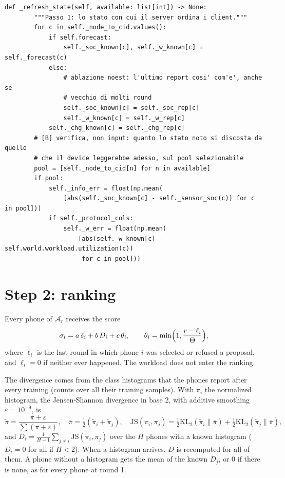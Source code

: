 \documentclass[11pt,a4paper]{article}
\begin{document}
\begin{lstlisting}[style=py,firstnumber=383,caption={\texttt{tesifl/strategies/sage\_smart.py}, lines 383--464}]
    def _refresh_state(self, available: list[int]) -> None:
        """Passo 1: lo stato con cui il server ordina i client."""
        for c in self._node_to_cid.values():
            if self.forecast:
                self._soc_known[c], self._w_known[c] = self._forecast(c)
            else:
                # ablazione noest: l'ultimo report cosi' com'e', anche se
                # vecchio di molti round
                self._soc_known[c] = self._soc_rep[c]
                self._w_known[c] = self._w_rep[c]
            self._chg_known[c] = self._chg_rep[c]
        # [B] verifica, non input: quanto lo stato noto si discosta da quello
        # che il device leggerebbe adesso, sul pool selezionabile
        pool = [self._node_to_cid[n] for n in available]
        if pool:
            self._info_err = float(np.mean(
                [abs(self._soc_known[c] - self._sensor_soc(c)) for c in pool]))
            if self._protocol_cols:
                self._w_err = float(np.mean(
                    [abs(self._w_known[c] - self.world.workload.utilization(c))
                     for c in pool]))
\end{lstlisting}

\newpage
\section{Step 2: ranking}
\label{sec:ranking}

Every phone of $\mathcal{A}_r$ receives the score
\begin{equation}
  \sigma_i = a \, \hat{s}_i + b \, D_i + c \, \theta_i ,
  \qquad
  \theta_i = \min\Bigl(1, \frac{r - \ell_i}{\Theta}\Bigr) ,
\end{equation}
where $\ell_i$ is the last round in which phone $i$ was selected or refused a
proposal, and $\ell_i = 0$ if neither ever happened. The workload does not
enter the ranking.

The divergence comes from the class histograms that the phones report after
every training (counts over all their training samples). With $\pi_i$ the
normalized histogram, the Jensen-Shannon divergence in base 2, with additive
smoothing $\varepsilon = 10^{-9}$, is
\begin{equation}
  \tilde{\pi} = \frac{\pi + \varepsilon}{\sum (\pi + \varepsilon)}, \quad
  \bar{\pi} = \tfrac{1}{2}(\tilde{\pi}_i + \tilde{\pi}_j), \quad
  \mathrm{JS}(\pi_i, \pi_j) = \tfrac{1}{2}\mathrm{KL}_2(\tilde{\pi}_i \| \bar{\pi})
                            + \tfrac{1}{2}\mathrm{KL}_2(\tilde{\pi}_j \| \bar{\pi}) ,
\end{equation}
and $D_i = \frac{1}{H - 1} \sum_{j \ne i} \mathrm{JS}(\pi_i, \pi_j)$ over the $H$
phones with a known histogram ($D_i = 0$ for all if $H < 2$). When a histogram arrives, $D$ is recomputed for
all of them. A phone without a histogram gets the mean of the known $D_j$, or 0
if there is none, as for every phone at round 1.
\end{document}
